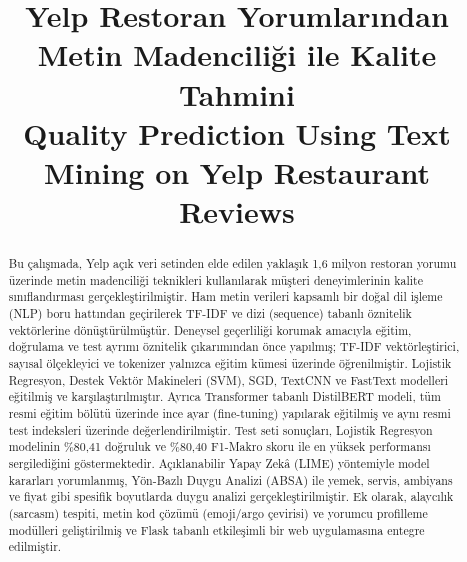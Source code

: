\documentclass[conference]{IEEEtran}
\begin{document}
\title{Yelp Restoran Yorumlarından Metin Madenciliği ile Kalite Tahmini \\
Quality Prediction Using Text Mining on Yelp Restaurant Reviews}

\author{
}

\maketitle

\begin{abstract}
Bu çalışmada, Yelp açık veri setinden elde edilen yaklaşık 1,6 milyon restoran yorumu üzerinde metin madenciliği teknikleri kullanılarak müşteri deneyimlerinin kalite sınıflandırması gerçekleştirilmiştir. Ham metin verileri kapsamlı bir doğal dil işleme (NLP) boru hattından geçirilerek TF-IDF ve dizi (sequence) tabanlı öznitelik vektörlerine dönüştürülmüştür. Deneysel geçerliliği korumak amacıyla eğitim, doğrulama ve test ayrımı öznitelik çıkarımından önce yapılmış; TF-IDF vektörleştirici, sayısal ölçekleyici ve tokenizer yalnızca eğitim kümesi üzerinde öğrenilmiştir. Lojistik Regresyon, Destek Vektör Makineleri (SVM), SGD, TextCNN ve FastText modelleri eğitilmiş ve karşılaştırılmıştır. Ayrıca Transformer tabanlı DistilBERT modeli, tüm resmi eğitim bölütü üzerinde ince ayar (fine-tuning) yapılarak eğitilmiş ve aynı resmi test indeksleri üzerinde değerlendirilmiştir. Test seti sonuçları, Lojistik Regresyon modelinin \%80,41 doğruluk ve \%80,40 F1-Makro skoru ile en yüksek performansı sergilediğini göstermektedir. Açıklanabilir Yapay Zekâ (LIME) yöntemiyle model kararları yorumlanmış, Yön-Bazlı Duygu Analizi (ABSA) ile yemek, servis, ambiyans ve fiyat gibi spesifik boyutlarda duygu analizi gerçekleştirilmiştir. Ek olarak, alaycılık (sarcasm) tespiti, metin kod çözümü (emoji/argo çevirisi) ve yorumcu profilleme modülleri geliştirilmiş ve Flask tabanlı etkileşimli bir web uygulamasına entegre edilmiştir.


\end{abstract}
\end{document}
